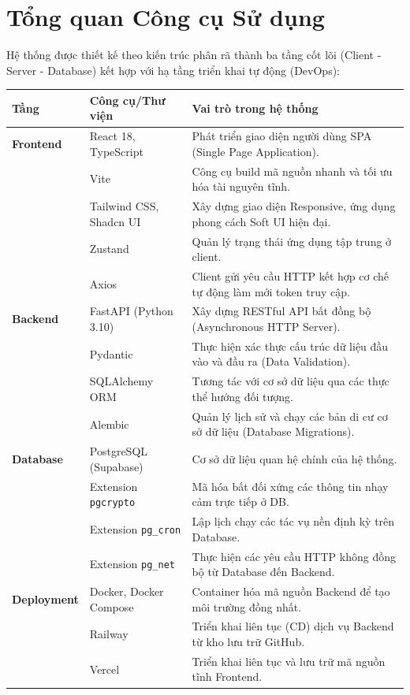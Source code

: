 \documentclass[12pt,a4paper]{report}
\begin{document}
\section{Tổng quan Công cụ Sử dụng}

Hệ thống được thiết kế theo kiến trúc phân rã thành ba tầng cốt lõi (Client - Server - Database) kết hợp với hạ tầng triển khai tự động (DevOps):

\begin{center}
  \begin{tabular}{L{3cm} L{4.5cm} L{6.5cm}}
    \toprule
    \textbf{Tầng} & \textbf{Công cụ/Thư viện} & \textbf{Vai trò trong hệ thống} \\
    \midrule
    \textbf{Frontend} 
      & React 18, TypeScript & Phát triển giao diện người dùng SPA (Single Page Application). \\
      & Vite & Công cụ build mã nguồn nhanh và tối ưu hóa tài nguyên tĩnh. \\
      & Tailwind CSS, Shadcn UI & Xây dựng giao diện Responsive, ứng dụng phong cách Soft UI hiện đại. \\
      & Zustand & Quản lý trạng thái ứng dụng tập trung ở client. \\
      & Axios & Client gửi yêu cầu HTTP kết hợp cơ chế tự động làm mới token truy cập. \\
    \midrule
    \textbf{Backend} 
      & FastAPI (Python 3.10) & Xây dựng RESTful API bất đồng bộ (Asynchronous HTTP Server). \\
      & Pydantic & Thực hiện xác thực cấu trúc dữ liệu đầu vào và đầu ra (Data Validation). \\
      & SQLAlchemy ORM & Tương tác với cơ sở dữ liệu qua các thực thể hướng đối tượng. \\
      & Alembic & Quản lý lịch sử và chạy các bản di cư cơ sở dữ liệu (Database Migrations). \\
    \midrule
    \textbf{Database} 
      & PostgreSQL (Supabase) & Cơ sở dữ liệu quan hệ chính của hệ thống. \\
      & Extension \texttt{pgcrypto} & Mã hóa bất đối xứng các thông tin nhạy cảm trực tiếp ở DB. \\
      & Extension \texttt{pg\_cron} & Lập lịch chạy các tác vụ nền định kỳ trên Database. \\
      & Extension \texttt{pg\_net} & Thực hiện các yêu cầu HTTP không đồng bộ từ Database đến Backend. \\
    \midrule
    \textbf{Deployment} 
      & Docker, Docker Compose & Container hóa mã nguồn Backend để tạo môi trường đồng nhất. \\
      & Railway & Triển khai liên tục (CD) dịch vụ Backend từ kho lưu trữ GitHub. \\
      & Vercel & Triển khai liên tục và lưu trữ mã nguồn tĩnh Frontend. \\
    \bottomrule
  \end{tabular}
\end{center}
\end{document}
